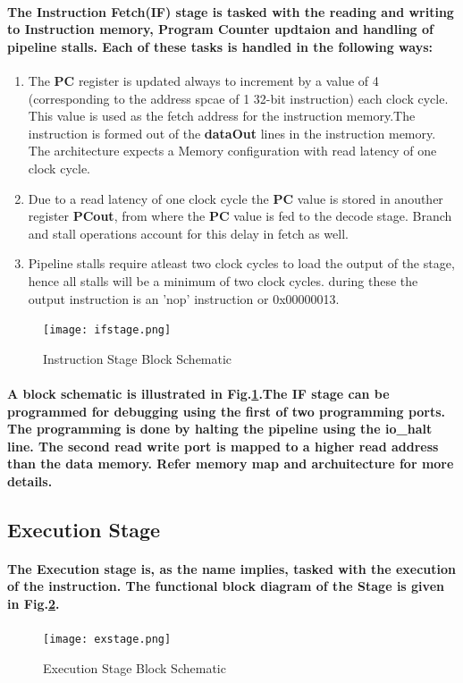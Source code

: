 \documentclass[12pt,a4paper]{report}
\begin{document}
\paragraph{\textrm{\textmd{The Instruction Fetch(IF) stage is tasked with the reading and writing to Instruction memory, Program Counter updtaion and handling of pipeline stalls. Each of these tasks is handled in the following ways:}}}
\begin{enumerate}
	\item The \textbf{PC} register is updated always to increment by a value of 4 (corresponding to the address spcae of 1 32-bit instruction) each clock cycle. This value is used as the fetch address for the instruction memory.The instruction is formed out of the \textbf{dataOut} lines in the instruction memory. The architecture expects a Memory configuration with read latency of one clock cycle.
	\item Due to a read latency of one clock cycle the \textbf{PC} value is stored in anouther register \textbf{PCout}, from where the \textbf{PC} value is fed to the decode stage. Branch and stall operations account for this delay in fetch as well.
	\item Pipeline stalls require atleast two clock cycles to load the output of the stage, hence all stalls will be a minimum of two clock cycles. during these the output instruction is an 'nop' instruction or 0x00000013.
\end{enumerate}
\begin{figure}[h]
	\centering
	\texttt{[image: ifstage.png]}
	\caption{Instruction Stage Block Schematic}
	\label{fig:ifstage}
\end{figure}
\paragraph{\textrm{\textmd{A block schematic is illustrated in Fig.\ref{fig:ifstage}.The IF stage can be programmed for debugging using  the first of two programming ports. The programming is done by halting the pipeline using the \textbf{io\_halt} line. The second read write port is mapped to a higher read address than the data memory. Refer memory map and archuitecture for more details.}}}
\subsection{Execution Stage}
\paragraph{\textrm{\textmd{The Execution stage is, as the name implies, tasked with the execution of the instruction. The functional block diagram of the Stage is given in Fig.\ref{fig:exstage}.  }}}
\begin{figure}[h]
	\centering
	\texttt{[image: exstage.png]}
	\caption{Execution Stage Block Schematic}
	\label{fig:exstage}
\end{figure}
\end{document}

